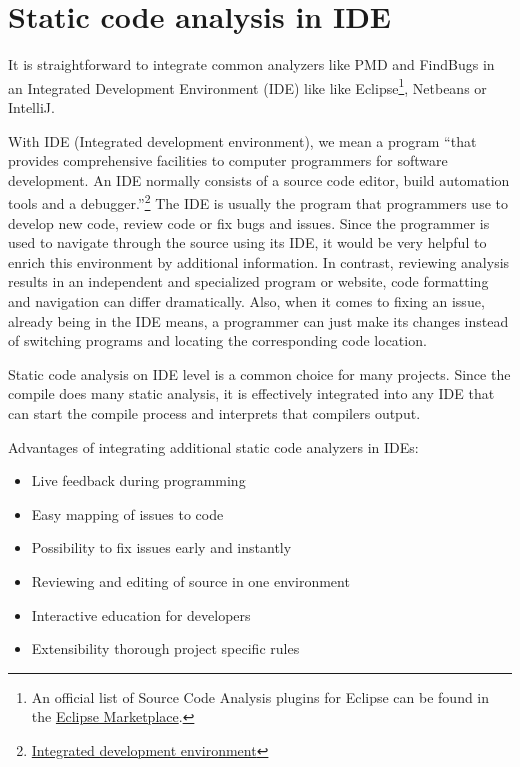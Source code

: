\documentclass[conference]{IEEEtran}
\begin{document}
\section{Static code analysis in IDE}
\label{sec:static_code_analysis_ide}
It is straightforward to integrate common analyzers like PMD and FindBugs in an Integrated Development Environment (IDE) like like Eclipse\footnote{An official list of Source Code Analysis plugins for Eclipse can be found in the \href{http://marketplace.eclipse.org/taxonomy/term/14,31}{Eclipse Marketplace}.}, Netbeans or IntelliJ.

With IDE (Integrated development environment), we mean a program ``that provides comprehensive facilities to computer programmers for software development. An IDE normally consists of a source code editor, build automation tools and a debugger.''\footnote{\href{http://en.wikipedia.org/wiki/Integrated_development_environment}{Integrated development environment}}
The IDE is usually the program that programmers use to develop new code, review code or fix bugs and issues. Since the programmer is used to navigate through the source using its IDE, it would be very helpful to enrich this environment by additional information. In contrast, reviewing analysis results in an independent and specialized program or website, code formatting and navigation can differ dramatically. Also, when it comes to fixing an issue, already being in the IDE means, a programmer can just make its changes instead of switching programs and locating the corresponding code location.

Static code analysis on IDE level is a common choice for many projects. Since the compile does many static analysis, it is effectively integrated into any IDE that can start the compile process and interprets that compilers output.

Advantages of integrating additional static code analyzers in IDEs:
\begin{itemize}
	\item Live feedback during programming
	\item Easy mapping of issues to code
	\item Possibility to fix issues early and instantly
	\item Reviewing and editing of source in one environment
	\item Interactive education for developers
	\item Extensibility thorough project specific rules
\end{itemize}
\end{document}
